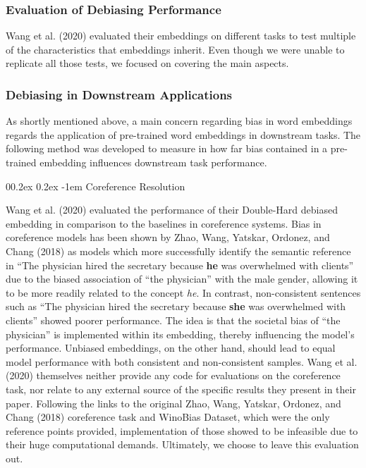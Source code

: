 \documentclass[
  english,
  man,floatsintext]{apa6}
\makeatletter
\let\oldparagraph\paragraph
\renewcommand{\paragraph}[1]{\oldparagraph{#1}\mbox{}}
\renewcommand{\paragraph}{\@startsection{paragraph}{4}{\parindent}%
  {0\baselineskip \@plus 0.2ex \@minus 0.2ex}%
  {-1em}%
  {\normalfont\normalsize\bfseries\itshape\typesectitle}}
\makeatother
\begin{document}
\hypertarget{evaluation-of-debiasing-performance}{%
\subsubsection{Evaluation of Debiasing Performance}\label{evaluation-of-debiasing-performance}}

Wang et al. (2020) evaluated their embeddings on different tasks to test multiple of the characteristics that embeddings inherit. Even though we were unable to replicate all those tests, we focused on covering the main aspects.

\hypertarget{debiasing-in-downstream-applications}{%
\subsubsection{Debiasing in Downstream Applications}\label{debiasing-in-downstream-applications}}

As shortly mentioned above, a main concern regarding bias in word embeddings regards the application of pre-trained word embeddings in downstream tasks. The following method was developed to measure in how far bias contained in a pre-trained embedding influences downstream task performance.

\hypertarget{coreference-resolution}{%
\paragraph{Coreference Resolution}\label{coreference-resolution}}

Wang et al. (2020) evaluated the performance of their Double-Hard debiased embedding in comparison to the baselines in coreference systems. Bias in coreference models has been shown by Zhao, Wang, Yatskar, Ordonez, and Chang (2018) as models which more successfully identify the semantic reference in ``The physician hired the secretary because \textbf{he} was overwhelmed with clients'' due to the biased association of ``the physician'' with the male gender, allowing it to be more readily related to the concept \emph{he}. In contrast, non-consistent sentences such as ``The physician hired the secretary because \textbf{she} was overwhelmed with clients'' showed poorer performance. The idea is that the societal bias of ``the physician'' is implemented within its embedding, thereby influencing the model's performance. Unbiased embeddings, on the other hand, should lead to equal model performance with both consistent and non-consistent samples.
Wang et al. (2020) themselves neither provide any code for evaluations on the coreference task, nor relate to any external source of the specific results they present in their paper. Following the links to the original Zhao, Wang, Yatskar, Ordonez, and Chang (2018) coreference task and WinoBias Dataset, which were the only reference points provided, implementation of those showed to be infeasible due to their huge computational demands. Ultimately, we choose to leave this evaluation out.
\end{document}
